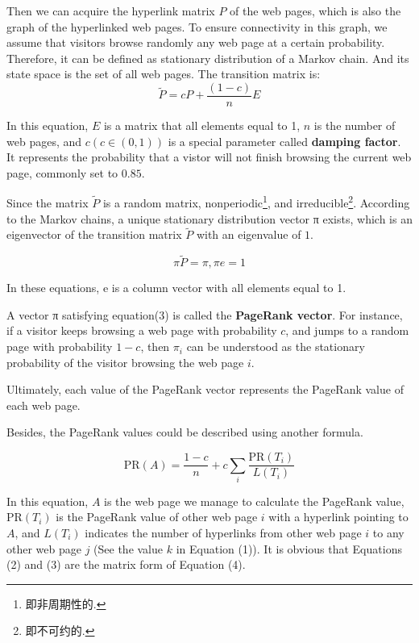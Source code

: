 \documentclass[lettersize,journal,12pt,conference]{IEEEtran}
\begin{document}
Then we can acquire the hyperlink matrix $P$ of the web pages, which is also the graph of the hyperlinked web pages.
To ensure connectivity in this graph, we assume that visitors browse randomly any web page at a certain probability. Therefore, it can be defined as stationary distribution of a Markov chain. And its state space is the set of all web pages. The transition matrix is:
\begin{equation}
	\label{eq:2}
	\widetilde{P} = cP + \frac{(1 - c)}{n}E
\end{equation}

In this equation, $E$ is a matrix that all elements equal to 1, $n$ is the number of web pages, and \(c (c \in (0,1))\) is a special parameter called \textbf{damping factor}. It represents the probability that a vistor will not finish browsing the current web page, commonly set to $0.85$\cite{ref4}.

Since the matrix $\widetilde{P}$ is a random matrix, nonperiodic\footnote[1]{即非周期性的.}, and irreducible\footnote[2]{即不可约的.}. According to the Markov chains\cite{ref5}, a unique stationary distribution vector π exists, which is an eigenvector of the transition matrix $\widetilde{P}$ with an eigenvalue of $1$\cite{ref6}. 

\begin{equation}
	\label{eq:3}
	\pi \widetilde{P} = \pi , \pi e = 1
\end{equation}

In these equations, e is a column vector with all elements equal to 1. 

A vector π satisfying equation(3) is called the \textbf{PageRank vector}. For instance, if a visitor keeps browsing a web page with probability $c$, and jumps to a random page with probability $1 - c$, then $\pi_i$ can be understood as the stationary probability of the visitor browsing the web page $i$.

Ultimately, each value of the PageRank vector represents the PageRank value of each web page. 

Besides, the PageRank values could be described using another formula.

\begin{equation}
	\label{eq:4}
	\text{PR}(A) = \frac{1 - c}{n} + c \sum_{i} \frac{\text{PR}(T_i)}{L(T_i)}
\end{equation}

In this equation, $A$ is the web page we manage to calculate the PageRank value,  $\text{PR}(T_i)$ is the PageRank value of other web page $i$ with a hyperlink pointing to $A$, and $L(T_i)$ indicates the number of hyperlinks from other web page $i$  to any other web page $j$ (See the value $k$ in Equation (1)). It is obvious that Equations (2) and (3) are the matrix form of Equation (4).
\end{document}
